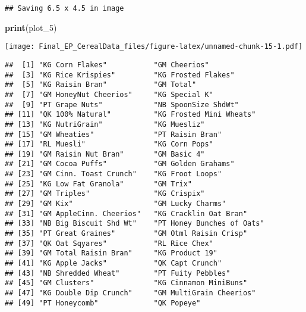 \documentclass[
]{article}
\newenvironment{Shaded}{\begin{snugshade}}{\end{snugshade}}
\newcommand{\FunctionTok}[1]{\textcolor[rgb]{0.13,0.29,0.53}{\textbf{#1}}}
\newcommand{\NormalTok}[1]{#1}
\newcommand{\OtherTok}[1]{\textcolor[rgb]{0.56,0.35,0.01}{#1}}
\newcommand{\SpecialCharTok}[1]{\textcolor[rgb]{0.81,0.36,0.00}{\textbf{#1}}}
\begin{document}
\begin{verbatim}
## Saving 6.5 x 4.5 in image
\end{verbatim}

\begin{Shaded}
\begin{Highlighting}[]
\FunctionTok{print}\NormalTok{(plot\_5)}
\end{Highlighting}
\end{Shaded}

\texttt{[image: Final\_EP\_CerealData\_files/figure-latex/unnamed-chunk-15-1.pdf]}

\begin{Shaded}
\end{Shaded}

\begin{verbatim}
##  [1] "KG Corn Flakes"           "GM Cheerios"             
##  [3] "KG Rice Krispies"         "KG Frosted Flakes"       
##  [5] "KG Raisin Bran"           "GM Total"                
##  [7] "GM HoneyNut Cheerios"     "KG Special K"            
##  [9] "PT Grape Nuts"            "NB SpoonSize ShdWt"      
## [11] "QK 100% Natural"          "KG Frosted Mini Wheats"  
## [13] "KG NutriGrain"            "KG Muesliz"              
## [15] "GM Wheaties"              "PT Raisin Bran"          
## [17] "RL Muesli"                "KG Corn Pops"            
## [19] "GM Raisin Nut Bran"       "GM Basic 4"              
## [21] "GM Cocoa Puffs"           "GM Golden Grahams"       
## [23] "GM Cinn. Toast Crunch"    "KG Froot Loops"          
## [25] "KG Low Fat Granola"       "GM Trix"                 
## [27] "GM Triples"               "KG Crispix"              
## [29] "GM Kix"                   "GM Lucky Charms"         
## [31] "GM AppleCinn. Cheerios"   "KG Cracklin Oat Bran"    
## [33] "NB Big Biscuit Shd Wt"    "PT Honey Bunches of Oats"
## [35] "PT Great Graines"         "GM Otml Raisin Crisp"    
## [37] "QK Oat Sqyares"           "RL Rice Chex"            
## [39] "GM Total Raisin Bran"     "KG Product 19"           
## [41] "KG Apple Jacks"           "QK Capt Crunch"          
## [43] "NB Shredded Wheat"        "PT Fuity Pebbles"        
## [45] "GM Clusters"              "KG Cinnamon MiniBuns"    
## [47] "KG Double Dip Crunch"     "GM MultiGrain Cheerios"  
## [49] "PT Honeycomb"             "QK Popeye"
\end{verbatim}
\end{document}
